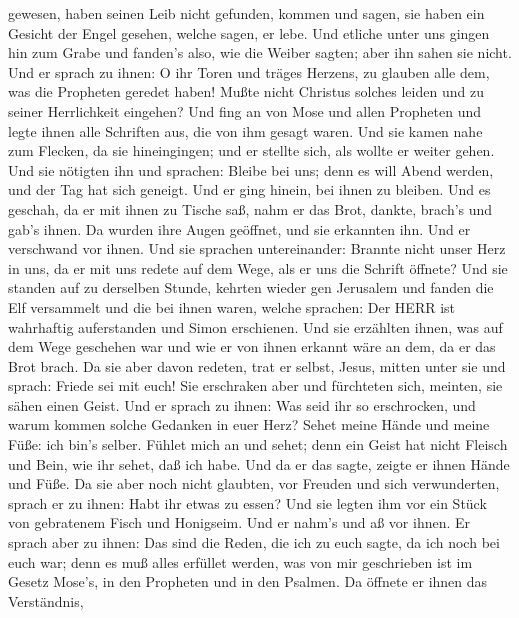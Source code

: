 gewesen,  haben seinen Leib nicht gefunden, kommen und
sagen, sie haben ein Gesicht der Engel gesehen, welche sagen, er lebe.
 Und etliche unter uns gingen hin zum Grabe und fanden's
also, wie die Weiber sagten; aber ihn sahen sie nicht.  Und
er sprach zu ihnen: O ihr Toren und träges Herzens, zu glauben alle dem,
was die Propheten geredet haben!  Mußte nicht Christus
solches leiden und zu seiner Herrlichkeit eingehen?  Und
fing an von Mose und allen Propheten und legte ihnen alle Schriften aus,
die von ihm gesagt waren.  Und sie kamen nahe zum Flecken,
da sie hineingingen; und er stellte sich, als wollte er weiter gehen.
 Und sie nötigten ihn und sprachen: Bleibe bei uns; denn es
will Abend werden, und der Tag hat sich geneigt. Und er ging hinein, bei
ihnen zu bleiben.  Und es geschah, da er mit ihnen zu
Tische saß, nahm er das Brot, dankte, brach's und gab's ihnen.
 Da wurden ihre Augen geöffnet, und sie erkannten ihn. Und
er verschwand vor ihnen.  Und sie sprachen untereinander:
Brannte nicht unser Herz in uns, da er mit uns redete auf dem Wege, als
er uns die Schrift öffnete?  Und sie standen auf zu
derselben Stunde, kehrten wieder gen Jerusalem und fanden die Elf
versammelt und die bei ihnen waren,  welche sprachen: Der
HERR ist wahrhaftig auferstanden und Simon erschienen.  Und
sie erzählten ihnen, was auf dem Wege geschehen war und wie er von ihnen
erkannt wäre an dem, da er das Brot brach.  Da sie aber
davon redeten, trat er selbst, Jesus, mitten unter sie und sprach:
Friede sei mit euch!  Sie erschraken aber und fürchteten
sich, meinten, sie sähen einen Geist.  Und er sprach zu
ihnen: Was seid ihr so erschrocken, und warum kommen solche Gedanken in
euer Herz?  Sehet meine Hände und meine Füße: ich bin's
selber. Fühlet mich an und sehet; denn ein Geist hat nicht Fleisch und
Bein, wie ihr sehet, daß ich habe.  Und da er das sagte,
zeigte er ihnen Hände und Füße.  Da sie aber noch nicht
glaubten, vor Freuden und sich verwunderten, sprach er zu ihnen: Habt
ihr etwas zu essen?  Und sie legten ihm vor ein Stück von
gebratenem Fisch und Honigseim.  Und er nahm's und aß vor
ihnen.  Er sprach aber zu ihnen: Das sind die Reden, die
ich zu euch sagte, da ich noch bei euch war; denn es muß alles erfüllet
werden, was von mir geschrieben ist im Gesetz Mose's, in den Propheten
und in den Psalmen.  Da öffnete er ihnen das Verständnis,
